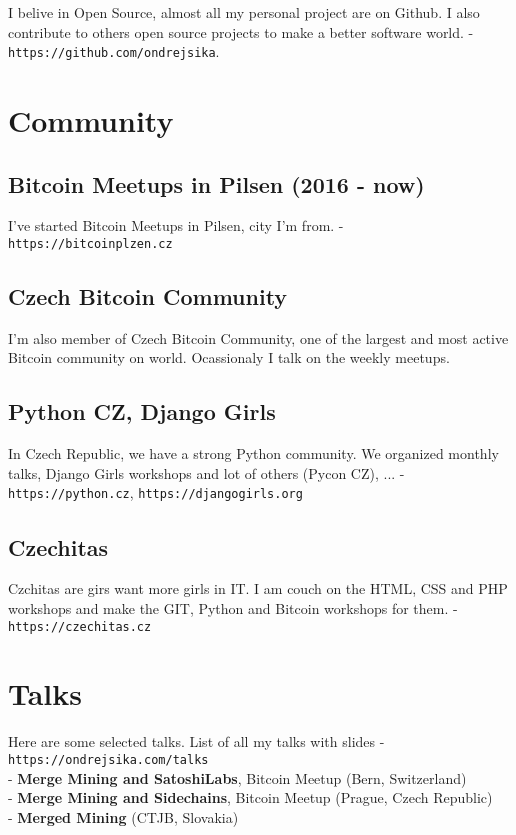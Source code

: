 \documentclass[12pt,a4paper]{article}
\begin{document}
I belive in Open Source, almost all my personal project are on Github. I also contribute to others open source projects to make a better software world. - \texttt{https://github.com/ondrejsika}.


\section*{Community}

\subsection*{Bitcoin Meetups in Pilsen (2016 - now)}
I've started Bitcoin Meetups in Pilsen, city I'm from. - \texttt{https://bitcoinplzen.cz}

\subsection*{Czech Bitcoin Community}
I'm also member of Czech Bitcoin Community, one of the largest and most active Bitcoin community on world. Ocassionaly I talk on the weekly meetups.

\subsection*{Python CZ, Django Girls}
In Czech Republic, we have a strong Python community. We organized monthly talks, Django Girls workshops and lot of others (Pycon CZ), ... - \texttt{https://python.cz}, \texttt{https://djangogirls.org}

\subsection*{Czechitas}
Czchitas are girs want more girls in IT. I am couch on the HTML, CSS and PHP workshops and make the GIT, Python and Bitcoin workshops for them. - \texttt{https://czechitas.cz}


\section*{Talks}

Here are some selected talks. List of all my talks with slides - \texttt{https://ondrejsika.com/talks}\\

- {\bf Merge Mining and SatoshiLabs}, Bitcoin Meetup (Bern, Switzerland)\\
- {\bf Merge Mining and Sidechains}, Bitcoin Meetup (Prague, Czech Republic)\\
- {\bf Merged Mining} (CTJB, Slovakia)
\end{document}
